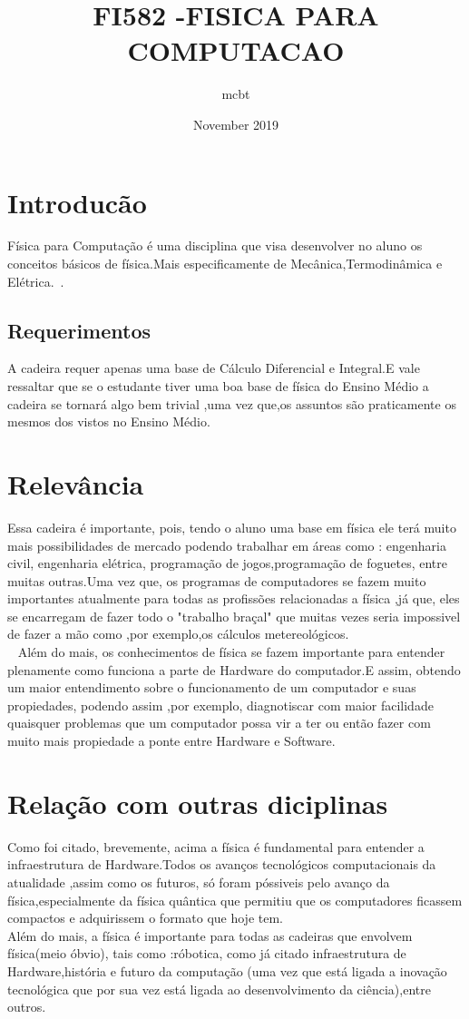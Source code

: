\documentclass{article}
\title{FI582 -FISICA PARA COMPUTACAO}
\author{mcbt}
\date{November 2019}
\begin{document}
\maketitle

\section{Introducão}
Física para Computação é uma disciplina que visa desenvolver no aluno os conceitos básicos de física.Mais especificamente de Mecânica,Termodinâmica e Elétrica.~\cite{garcia2012physics}.
\subsection{Requerimentos}
A cadeira requer apenas uma base de Cálculo Diferencial e Integral.E vale ressaltar que se o estudante tiver  uma boa base de física do Ensino Médio a cadeira se tornará algo bem trivial ,uma vez que,os assuntos são praticamente os mesmos dos vistos no Ensino Médio.
\section{Relevância}
Essa cadeira é importante, pois, tendo o aluno uma base em física ele terá muito mais possibilidades de mercado podendo trabalhar em áreas como : engenharia civil, engenharia elétrica, programação de jogos,programação de foguetes, entre muitas outras.Uma vez que, os programas de computadores se fazem muito importantes atualmente para todas as profissões relacionadas a física ,já que, eles se encarregam de fazer todo o "trabalho braçal" que muitas vezes seria impossivel de fazer a mão como ,por exemplo,os cálculos metereológicos.~\cite{pang1999introduction}\\
~\cite{moody2009physics}
Além do mais, os conhecimentos de física se fazem importante para entender plenamente como funciona a parte de Hardware do computador.E assim, obtendo um maior entendimento sobre o funcionamento de um computador e suas propiedades, podendo assim ,por exemplo, diagnotiscar com maior facilidade quaisquer problemas que um computador possa vir a ter ou então fazer com muito mais propiedade a ponte entre Hardware e Software.
\section{Relação com outras diciplinas }
Como foi citado, brevemente, acima a física é fundamental para entender a infraestrutura de Hardware.Todos os avanços tecnológicos computacionais da atualidade ,assim como os futuros, só foram póssiveis pelo avanço da física,especialmente da física quântica que permitiu que os computadores ficassem compactos e adquirissem o formato que hoje tem.\\

Além do mais, a física é importante para todas as cadeiras que envolvem física(meio óbvio), tais como :róbotica, como já citado infraestrutura de Hardware,história e futuro da computação (uma vez que está ligada a inovação tecnológica que por sua vez está ligada ao desenvolvimento da ciência),entre outros.


\end{document}
